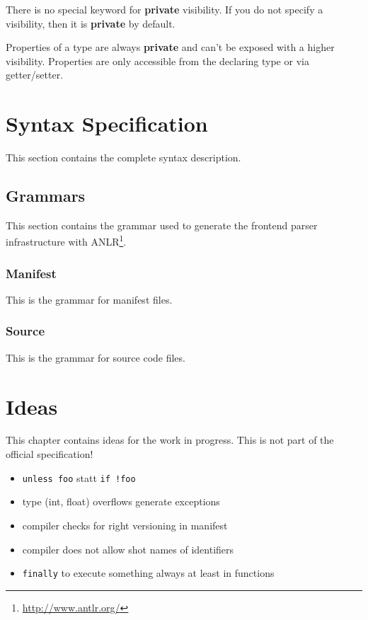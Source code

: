 \documentclass[11pt,a4paper]{report}
\begin{document}
There is no special keyword for \textbf{private} visibility. If you do not specify a visibility, then it is \textbf{private} by default.

Properties of a type are always \textbf{private} and can't be exposed with a higher visibility. Properties are only accessible from the declaring type or via getter/setter.

\chapter{Syntax Specification}

This section contains the complete syntax description.

\section{Grammars}

This section contains the grammar used to generate the frontend parser infrastructure with ANLR\footnote{\url{http://www.antlr.org/}}.

\subsection{Manifest}

This is the grammar for manifest files.



\subsection{Source}

This is the grammar for source code files.



\chapter{Ideas}


This chapter contains ideas for the work in progress. This is not part of the official specification!

\begin{itemize}
    \item \texttt{unless foo} statt \texttt{if !foo}
    \item type (int, float) overflows generate exceptions
    \item compiler checks for right versioning in manifest
    \item compiler does not allow shot names of identifiers
    \item \texttt{finally} to execute something always at least in functions
\end{itemize}
\end{document}
